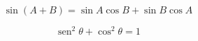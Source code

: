 \documentclass{article}
\DeclareMathOperator{\sen}{sen} %
\begin{document}
	
	\[ \sin\left( A + B \right) = \sin A \cos B + \sin B \cos A \]

	
	\[\sen^2 \theta + \cos^2 \theta = 1\] %
	
\end{document}
